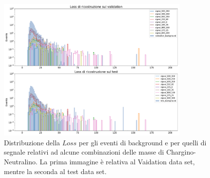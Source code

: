 \begin{figure}[h!]
	\centering
	\includegraphics[width=0.85\textwidth]{figs/risultati_simulazione/distribuzioneLoss.pdf}
	\caption{Distribuzione della $\textit{Loss}$ per gli eventi di background e per quelli di segnale relativi ad alcune combinazioni delle masse di Chargino-Neutralino. La prima immagine è relativa al Vaidation data set, mentre la seconda al test data set.}
	\label{distribuzione_loss}
\end{figure}

